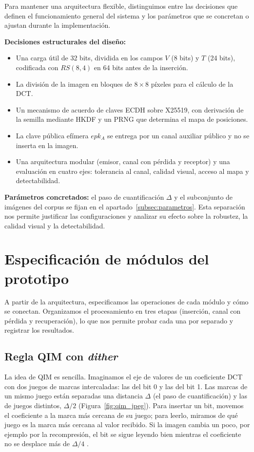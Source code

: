 \documentclass[IB]{TFUOC}%
\begin{document}
Para mantener una arquitectura flexible, distinguimos entre las decisiones que definen el funcionamiento general del sistema y los parámetros que se concretan o ajustan durante la implementación.

\textbf{Decisiones estructurales del diseño:}
\begin{itemize}
    \item Una carga útil de 32 bits, dividida en los campos $V$ (8 bits) y $T$ (24 bits), codificada con $RS(8,4)$ en 64 bits antes de la inserción.
    \item La división de la imagen en bloques de $8\times8$ píxeles para el cálculo de la DCT.
    \item Un mecanismo de acuerdo de claves ECDH sobre X25519, con derivación de la semilla mediante HKDF y un PRNG que determina el mapa de posiciones.
    \item La clave pública efímera $epk_A$ se entrega por un canal auxiliar público y no se inserta en la imagen.
    \item Una arquitectura modular (emisor, canal con pérdida y receptor) y una evaluación en cuatro ejes: tolerancia al canal, calidad visual, acceso al mapa y detectabilidad.
\end{itemize}

\textbf{Parámetros concretados:} el paso de cuantificación $\Delta$ y el subconjunto de imágenes del corpus se fijan en el apartado~\ref{subsec:parametros}. Esta separación nos permite justificar las configuraciones y analizar su efecto sobre la robustez, la calidad visual y la detectabilidad.

\section{Especificación de módulos del prototipo}
\label{sec:especificacion_modulos}

A partir de la arquitectura, especificamos las operaciones de cada módulo y cómo se conectan. Organizamos el procesamiento en tres etapas (inserción, canal con pérdida y recuperación), lo que nos permite probar cada una por separado y registrar los resultados.

\subsection{Regla QIM con \textit{dither}}
\label{subsec:regla_qim}

La idea de QIM es sencilla. Imaginamos el eje de valores de un coeficiente DCT con dos juegos de marcas intercaladas: las del bit 0 y las del bit 1. Las marcas de un mismo juego están separadas una distancia $\Delta$ (el paso de cuantificación) y las de juegos distintos, $\Delta/2$ (Figura~\ref{fig:qim_jpeg}). Para insertar un bit, movemos el coeficiente a la marca más cercana de su juego; para leerlo, miramos de qué juego es la marca más cercana al valor recibido. Si la imagen cambia un poco, por ejemplo por la recompresión, el bit se sigue leyendo bien mientras el coeficiente no se desplace más de $\Delta/4$ \cite{11}.
\end{document}

